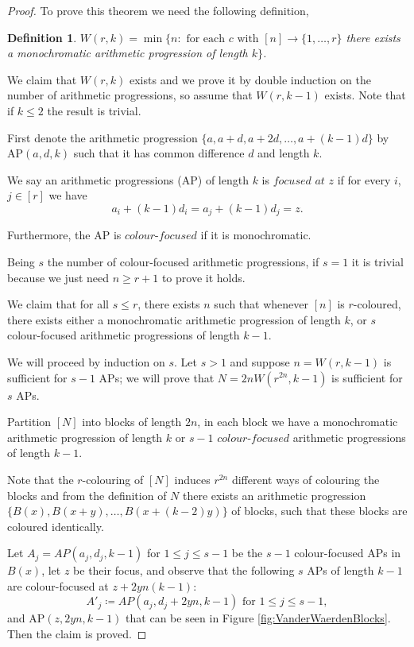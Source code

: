 \documentclass[12pt,twoside,a4paper,bibliography=totocnumbered]{book}
\numberwithin{equation}{section}
\newtheorem{definition}	[theorem] {Definition}
\theoremstyle{remark}
\begin{document}
\begin{proof}To prove this theorem we need the following definition,

\begin{definition}
$W(r,k) = \min \{n \colon \text{ for each } c \text{ with } [n] \rightarrow \{1,\ldots,r\}$ there exists a monochromatic arithmetic  progression of length $k \}$.
\end{definition}
We claim that $W(r,k)$ exists and we prove it by double induction on the number of arithmetic progressions, so assume that $W(r, k-1)$ exists. Note that if $k \leq 2$ the result is trivial.

First denote the arithmetic progression $\{a, a + d, a +2d, \ldots, a+(k-1)d\}$ by AP$(a,d,k)$ such that it has common difference  $d$ and length $k$.

We say an arithmetic progressions (AP) of length $k$ is $\textit{focused at}$ $z$ if for every $i$, $j \in [r]$ we have
 $$ a_i +  (k-1)d_i = a_j  + (k-1) d_j = z .$$

Furthermore, the AP is $\textit{colour-focused}$ if it is monochromatic.

Being $s$ the number of colour-focused arithmetic progressions, if $s=1$ it is trivial because we just need $n \geq r+1$ to prove it holds.

We claim that for all $s \leq r$, there exists $n$ such that whenever $[n]$ is $r$-coloured, there exists either a monochromatic arithmetic progression of length $k$, or $s$ colour-focused arithmetic progressions of length $k-1$.

We will proceed by induction on $s$. Let $s > 1$ and suppose $n=W(r,k-1)$ is sufficient for $s-1$ APs; we will prove that $N=2n W(r^{2n},k-1)$ is sufficient for $s$ APs.

Partition $[N]$ into blocks of length $2n$, in each block we have a monochromatic arithmetic progression of length $k$ or $s-1$ $\textit{colour-focused}$ arithmetic progressions of length $k-1$. 

Note that the $r$-colouring of $[N]$ induces $r^{2n}$ different ways of colouring the blocks and from the definition of $N$ there exists an arithmetic progression $\{B(x), B(x+y), \ldots , B(x+(k-2)y)\}$ of blocks, such that these blocks are coloured identically.

Let $A_j = AP(a_j, d_j, k-1)$ for $1 \leq j \leq s-1$ be the $s-1$ colour-focused APs in $B(x)$, let $z$ be their focus, and observe that the following $s$ APs of length $k-1$ are colour-focused at $z+ 2yn(k-1) \colon$
$$ A'_j \coloneqq AP(a_j, d_j + 2yn, k-1) \text{ for }1 \leq j \leq s-1,$$ 
and AP$(z, 2yn, k-1)$ that can be seen in Figure \ref{fig:VanderWaerdenBlocks}. Then the claim is proved.


\end{proof}
\end{document}
